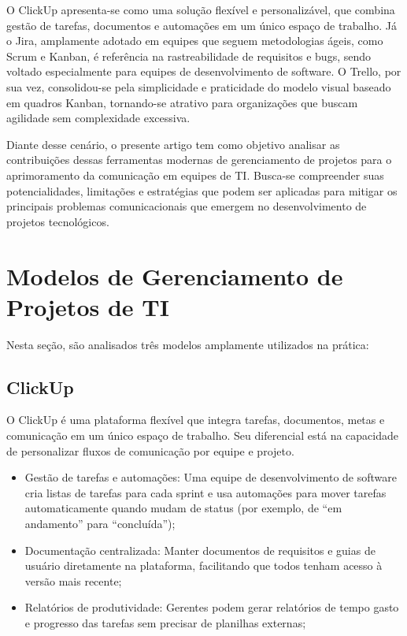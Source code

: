 \documentclass[12pt]{article}
\begin{document}
O ClickUp apresenta-se como uma solução flexível e personalizável, que combina gestão de tarefas, documentos e automações em um único espaço de trabalho. Já o Jira, amplamente adotado em equipes que seguem metodologias ágeis, como Scrum e Kanban, é referência na rastreabilidade de requisitos e bugs, sendo voltado especialmente para equipes de desenvolvimento de software. O Trello, por sua vez, consolidou-se pela simplicidade e praticidade do modelo visual baseado em quadros Kanban, tornando-se atrativo para organizações que buscam agilidade sem complexidade excessiva.

Diante desse cenário, o presente artigo tem como objetivo analisar as contribuições dessas ferramentas modernas de gerenciamento de projetos para o aprimoramento da comunicação em equipes de TI. Busca-se compreender suas potencialidades, limitações e estratégias que podem ser aplicadas para mitigar os principais problemas comunicacionais que emergem no desenvolvimento de projetos tecnológicos.

\clearpage
\newpage
\newpage

\setcounter{page}{4} %

\section{Modelos de Gerenciamento de Projetos de TI}
Nesta seção, são analisados três modelos amplamente utilizados na prática:

\subsection{ClickUp}
O ClickUp é uma plataforma flexível que integra tarefas, documentos, metas e comunicação em um único espaço de trabalho. Seu diferencial está na capacidade de personalizar fluxos de comunicação por equipe e projeto.
\begin{itemize}
    \item Gestão de tarefas e automações: Uma equipe de desenvolvimento de software cria listas de tarefas para cada sprint e usa automações para mover tarefas automaticamente quando mudam de status (por exemplo, de “em andamento” para “concluída”);
    \item Documentação centralizada: Manter documentos de requisitos e guias de usuário diretamente na plataforma, facilitando que todos tenham acesso à versão mais recente;
    \item Relatórios de produtividade: Gerentes podem gerar relatórios de tempo gasto e progresso das tarefas sem precisar de planilhas externas;
\end{itemize}
\end{document}
